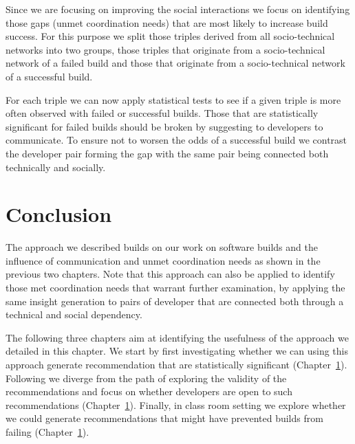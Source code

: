 Since we are focusing on improving the social interactions we focus on identifying those gaps (unmet coordination needs) that are most likely to increase build success.
For this purpose we split those triples derived from all socio-technical networks into two groups, those triples that originate from a socio-technical network of a failed build and those that originate from a socio-technical network of a successful build.

For each triple we can now apply statistical tests to see if a given triple is more often observed with failed or successful builds.
Those that are statistically significant for failed builds should be broken by suggesting to developers to communicate.
To ensure not to worsen the odds of a successful build we contrast the developer pair forming the gap with the same pair being connected both technically and socially.

\section{Conclusion}
The approach we described builds on our work on software builds and the influence of communication and unmet coordination needs as shown in the previous two chapters.
Note that this approach can also be applied to identify those met coordination needs that warrant further examination, by applying the same insight generation to pairs of developer that are connected both through a technical and social dependency.

The following three chapters aim at identifying the usefulness of the approach we detailed in this chapter.
We start by first investigating whether we can using this approach generate recommendation that are statistically significant (Chapter~\ref{}).
Following we diverge from the path of exploring the validity of the recommendations and focus on whether developers are open to such recommendations (Chapter~\ref{}).
Finally, in class room setting we explore whether we could generate recommendations that might have prevented builds from failing (Chapter~\ref{}).